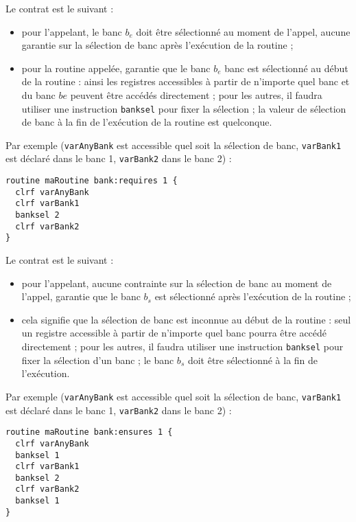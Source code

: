 
Le contrat est le suivant :
\begin{itemize}
  \item pour l'appelant, le banc $b_e$ doit être sélectionné au moment de l'appel, aucune garantie sur la sélection de banc après l'exécution de la routine ; 
  \item pour la routine appelée, garantie que le banc $b_e$ banc est sélectionné au début de la routine : ainsi les registres accessibles à partir de n'importe quel banc et du banc $be$ peuvent être accédés directement ; pour les autres, il faudra utiliser une instruction \texttt{banksel} pour fixer la sélection ; la valeur de sélection de banc à la fin de l'exécution de la routine est quelconque.
\end{itemize}

Par exemple (\texttt{varAnyBank} est accessible quel soit la sélection de banc, \texttt{varBank1} est déclaré dans le banc 1, \texttt{varBank2} dans le banc 2) :
\begin{lstlisting}[language=piccolo]
routine maRoutine bank:requires 1 {
  clrf varAnyBank
  clrf varBank1
  banksel 2
  clrf varBank2
}
\end{lstlisting}








Le contrat est le suivant :
\begin{itemize}
  \item pour l'appelant, aucune contrainte sur la sélection de banc au moment de l'appel, garantie que le banc $b_s$ est sélectionné après l'exécution de la routine ; 
  \item cela signifie que la sélection de banc est inconnue au début de la routine : seul un registre accessible à partir de n'importe quel banc pourra être accédé directement ; pour les autres, il faudra utiliser une instruction \texttt{banksel} pour fixer la sélection d'un banc ; le banc $b_s$ doit être sélectionné à la fin de l'exécution.
\end{itemize}

Par exemple (\texttt{varAnyBank} est accessible quel soit la sélection de banc, \texttt{varBank1} est déclaré dans le banc 1, \texttt{varBank2} dans le banc 2) :
\begin{lstlisting}[language=piccolo]
routine maRoutine bank:ensures 1 {
  clrf varAnyBank
  banksel 1
  clrf varBank1
  banksel 2
  clrf varBank2
  banksel 1
}
\end{lstlisting}

